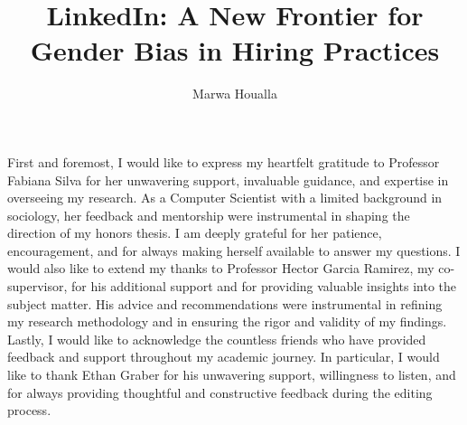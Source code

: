 \documentclass[12pt]{caltech_thesis}
\begin{document}
\title{LinkedIn: A New Frontier for Gender Bias in Hiring Practices}
\author{Marwa Houalla}

\degreeaward{}                 %
\address{Ann Arbor, Michigan}                     %



\maketitle[logo]

\begin{acknowledgements} 	 
   First and foremost, I would like to express my heartfelt gratitude to Professor Fabiana Silva for her unwavering support, invaluable guidance, and expertise in overseeing my research. As a Computer Scientist with a limited background in sociology, her feedback and mentorship were instrumental in shaping the direction of my honors thesis. I am deeply grateful for her patience, encouragement, and for always making herself available to answer my questions. I would also like to extend my thanks to Professor Hector Garcia Ramirez, my co-supervisor, for his additional support and for providing valuable insights into the subject matter. His advice and recommendations were instrumental in refining my research methodology and in ensuring the rigor and validity of my findings. Lastly, I would like to acknowledge the countless friends who have provided feedback and support throughout my academic journey. In particular, I would like to thank Ethan Graber for his unwavering support, willingness to listen, and for always providing thoughtful and constructive feedback during the editing process.
\end{acknowledgements}
\end{document}
